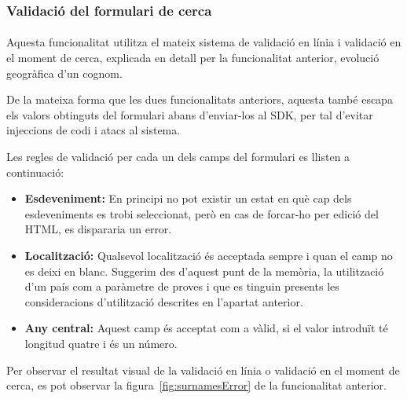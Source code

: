 \subsubsection{Validació del formulari de cerca}

\paragraph{}
Aquesta funcionalitat utilitza el mateix sistema de validació en línia i validació en el moment de cerca, explicada en detall per la funcionalitat anterior, evolució geogràfica d’un cognom.

De la mateixa forma que les dues funcionalitats anteriors, aquesta també escapa els valors obtinguts del formulari abans d’enviar-los al SDK, per tal d'evitar injeccions de codi i atacs al sistema.

Les regles de validació per cada un dels camps del formulari es llisten a con\-ti\-nua\-ció:

\begin{itemize}
    \item \textbf{Esdeveniment:} En principi no pot existir un estat en què cap dels esdeveniments es trobi seleccionat, però en cas de forcar-ho per edició del HTML, es dispararia un error.
    \item \textbf{Localització:} Qualsevol localització és acceptada sempre i quan el camp no es deixi en blanc. Suggerim des d'aquest punt de la memòria, la utilització d’un país com a paràmetre de proves i que es tinguin presents les consideracions d'utilització descrites en l’apartat anterior.
    \item \textbf{Any central:} Aquest camp és acceptat com a vàlid, si el valor introduït té longitud quatre i és un número.
\end{itemize}

Per observar el resultat visual de la validació en línia o validació en el moment de cerca, es pot observar la figura~\ref{fig:surnamesError} de la funcionalitat anterior.
